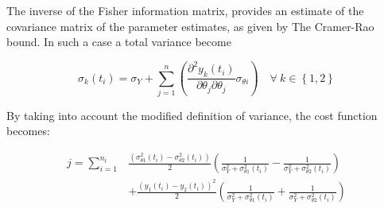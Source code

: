\documentclass[../Article_Design_of_Experiment.tex]{subfiles}
\begin{document}
	The inverse of the Fisher information matrix, provides an estimate of the covariance matrix of the parameter estimates, as given by The Cramer-Rao bound. In such a case a total variance become
	
	{\footnotesize
	\begin{equation}
		\sigma_k(t_i) = \sigma_Y + \sum_{j=1}^{n} \left(\frac{\partial^2 y_k(t_i)}{\partial \theta_j \partial \theta_j} \sigma_{\theta i} \right) \quad \forall ~ k\in \left\{1,2\right\}
	\end{equation}
	}
	
	By taking into account the modified definition of variance, the cost function becomes:
	
	{\footnotesize
	\begin{align}
		j = \sum_{i=1}^{n_t} &\frac{\left(\sigma_{\theta 1}^2(t_i) - \sigma_{\theta 2}^2(t_i)\right)}{2}  \left( \frac{1}{\sigma_{Y}^2 + \sigma_{\theta 1}^2(t_i)} - \frac{1}{\sigma_{Y}^2 + \sigma_{\theta 2}^2(t_i)} \right) \nonumber \\
		&+ \frac{\left( y_1(t_i) - y_2(t_i) \right)^2}{2} \left( \frac{1}{\sigma_{Y}^2 + \sigma_{\theta 1}^2(t_i)} + \frac{1}{\sigma_{Y}^2 + \sigma_{\theta 2}^2(t_i)} \right)  
		\end{align}}
	
\end{document}
